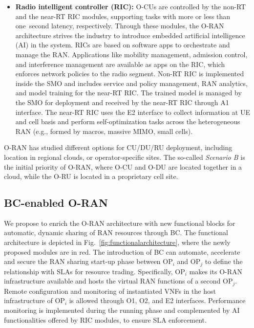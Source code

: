 \documentclass[journal]{IEEEtran}
\begin{document}
\begin{itemize}
    \item \textbf{Radio intelligent controller (RIC):} O-CUs are controlled by the non-RT and the near-RT RIC modules, supporting tasks with more or less than one~second latency, respectively. Through these modules, the {O-RAN} architecture strives the industry to introduce embedded artificial intelligence (AI) in the system. RICs are based on software apps to orchestrate and manage the RAN. Applications like mobility management, admission control, and interference management are available as apps on the RIC, which enforces network policies to the radio segment. Non-RT RIC is implemented inside the SMO and includes service and policy management, RAN analytics, and model training for the near-RT RIC. The trained model is managed by the SMO for deployment and received by the near-RT RIC through A1 interface. The near-RT RIC uses the E2 interface to collect information at UE and cell basis and perform self-optimization tasks across the heterogeneous RAN (e.g., formed by macros, massive MIMO, small cells).
\end{itemize}
O-RAN has studied different options for CU/DU/RU deployment, including location in regional clouds, or operator-specific sites. The so-called \textit{Scenario B} is the initial priority of {O-RAN}, where O-CU and O-DU are located together in a cloud, while the O-RU is located in a proprietary cell site.

\subsection{BC-enabled O-RAN}
We propose to enrich the O-RAN architecture with new functional blocks for automatic, dynamic sharing of RAN resources through BC. The functional architecture is depicted in Fig.~\ref{fig:functionalarchitecture}, where the newly proposed modules are in red. The introduction of BC can automate, accelerate and secure the RAN sharing start-up phase between OP$_i$ and OP$_j$ to define the relationship with SLAs for resource trading. Specifically, OP$_i$ makes its {O-RAN} infrastructure available and hosts the virtual RAN functions of a second OP$_j$. Remote configuration and monitoring of instantiated VNFs in the host infrastructure of OP$_i$ is allowed through O1, O2, and E2 interfaces. Performance monitoring is implemented during the running phase and complemented by AI functionalities offered by RIC modules, to ensure SLA enforcement. 
\end{document}
